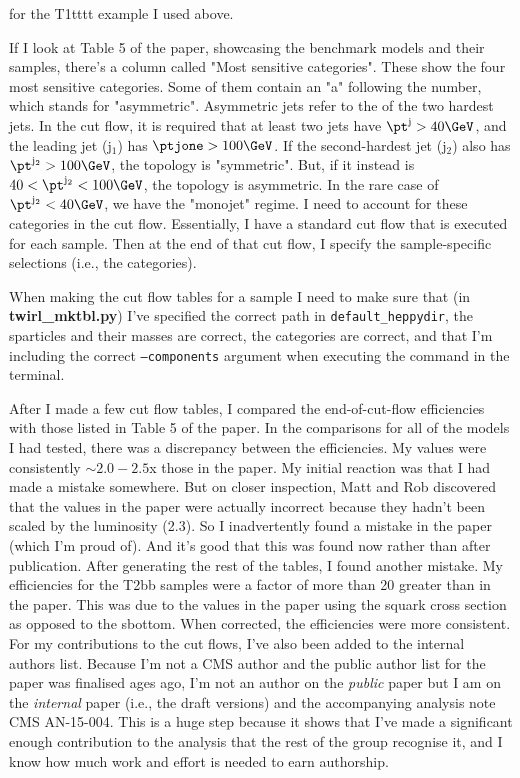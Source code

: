 for the T1tttt example I used above.

If I look at Table 5 of the paper, showcasing the benchmark models and their samples, there's a column called "Most sensitive \njet categories". These show the four most sensitive categories. Some of them contain an "a" following the number, which stands for "asymmetric". Asymmetric jets refer to the \pt of the two hardest jets. In the cut flow, it is required that at least two jets have $\pt^{\mathrm{j}} > 40\GeV$, and the leading jet (j$_1$) has $\ptjone > 100\GeV$. If the second-hardest jet (j$_2$) also has $\pt^{\mathrm{j_2}} > 100\GeV$, the topology is "symmetric". But, if it instead is $40 < \pt^{\mathrm{j_2}} < 100\GeV$, the topology is asymmetric. In the rare case of $\pt^{\mathrm{j_2}} < 40\GeV$, we have the "monojet" regime. I need to account for these \njet categories in the cut flow. Essentially, I have a standard cut flow that is executed for each sample. Then at the end of that cut flow, I specify the sample-specific selections (i.e., the \njet categories).

When making the cut flow tables for a sample I need to make sure that (in \textbf{twirl\_mktbl.py}) I've specified the correct path in \texttt{default\_heppydir}, the sparticles and their masses are correct, the \njet categories are correct, and that I'm including the correct \texttt{--components} argument when executing the command in the terminal.

After I made a few cut flow tables, I compared the end-of-cut-flow efficiencies with those listed in Table 5 of the paper. In the comparisons for all of the models I had tested, there was a discrepancy between the efficiencies. My values were consistently $\sim 2.0-2.5$x those in the paper. My initial reaction was that I had made a mistake somewhere. But on closer inspection, Matt and Rob discovered that the values in the paper were actually incorrect because they hadn't been scaled by the luminosity (2.3\fbinv). So I inadvertently found a mistake in the paper (which I'm proud of). And it's good that this was found now rather than after publication. After generating the rest of the tables, I found another mistake. My efficiencies for the T2bb samples were a factor of more than 20 greater than in the paper. This was due to the values in the paper using the squark cross section as opposed to the sbottom. When corrected, the efficiencies were more consistent. For my contributions to the cut flows, I've also been added to the internal authors list. Because I'm not a CMS author and the public author list for the paper was finalised ages ago, I'm not an author on the \emph{public} paper but I am on the \emph{internal} paper (i.e., the draft versions) and the accompanying analysis note CMS AN-15-004. This is a huge step because it shows that I've made a significant enough contribution to the analysis that the rest of the group recognise it, and I know how much work and effort is needed to earn authorship.

